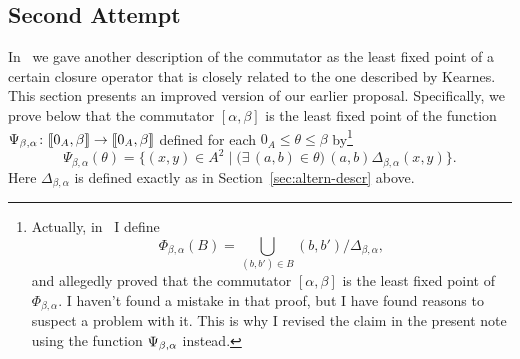 \subsection{Second Attempt}
In~\cite{com-fix-poi} we gave another description of the commutator
as the least fixed point of a certain closure operator that is closely related
to the one described by Kearnes.
This section presents an improved version of our earlier proposal.
Specifically, we prove below that the commutator $[\alpha, \beta]$ is the least fixed
point of the function
$\Psi_{\beta, \alpha} \colon \llbracket 0_A, \beta\rrbracket\to \llbracket 0_A, \beta\rrbracket$
defined for each $0_A \leq \theta \leq \beta$ by\footnote{Actually, in~\cite{com-fix-poi}
I define %
\begin{equation*}
  \Phi_{\beta, \alpha}(B) = \bigcup_{(b,b')\in B} (b,b')/\Delta_{\beta, \alpha},
\end{equation*}
and allegedly proved that the commutator $[\alpha, \beta]$ is the least fixed point
of $\Phi_{\beta, \alpha}$.  I haven't found a mistake in that proof, but I have found reasons to
suspect a problem with it.  This is why I revised the claim in the present note
using the function $\Psi_{\beta, \alpha}$ instead.}
\begin{equation}
  \label{eq:7}
  \Psi_{\beta, \alpha}(\theta)
  = \{ (x,y) \in A^2 \mid
  \bigl(\exists\, (a,b) \in \theta\big)\,
 (a,b) \mathrel{\Delta_{\beta, \alpha}} (x,y)\}.
\end{equation}
Here $\Delta_{\beta, \alpha}$ is defined exactly as 
in Section~\ref{sec:altern-descr} above.

\pagebreak

